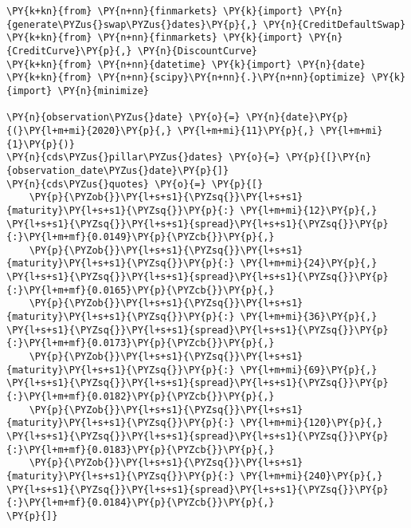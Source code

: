 \begin{Answer}
\begin{codebox}[size=fbox, boxrule=1pt, pad at break*=1mm,colback=cellbackground, colframe=cellborder]
\begin{Verbatim}[commandchars=\\\{\}]
\PY{k+kn}{from} \PY{n+nn}{finmarkets} \PY{k}{import} \PY{n}{generate\PYZus{}swap\PYZus{}dates}\PY{p}{,} \PY{n}{CreditDefaultSwap}
\PY{k+kn}{from} \PY{n+nn}{finmarkets} \PY{k}{import} \PY{n}{CreditCurve}\PY{p}{,} \PY{n}{DiscountCurve}
\PY{k+kn}{from} \PY{n+nn}{datetime} \PY{k}{import} \PY{n}{date}
\PY{k+kn}{from} \PY{n+nn}{scipy}\PY{n+nn}{.}\PY{n+nn}{optimize} \PY{k}{import} \PY{n}{minimize}

\PY{n}{observation\PYZus{}date} \PY{o}{=} \PY{n}{date}\PY{p}{(}\PY{l+m+mi}{2020}\PY{p}{,} \PY{l+m+mi}{11}\PY{p}{,} \PY{l+m+mi}{1}\PY{p}{)}
\PY{n}{cds\PYZus{}pillar\PYZus{}dates} \PY{o}{=} \PY{p}{[}\PY{n}{observation_date\PYZus{}date}\PY{p}{]}
\PY{n}{cds\PYZus{}quotes} \PY{o}{=} \PY{p}{[}
    \PY{p}{\PYZob{}}\PY{l+s+s1}{\PYZsq{}}\PY{l+s+s1}{maturity}\PY{l+s+s1}{\PYZsq{}}\PY{p}{:} \PY{l+m+mi}{12}\PY{p}{,} \PY{l+s+s1}{\PYZsq{}}\PY{l+s+s1}{spread}\PY{l+s+s1}{\PYZsq{}}\PY{p}{:}\PY{l+m+mf}{0.0149}\PY{p}{\PYZcb{}}\PY{p}{,}
    \PY{p}{\PYZob{}}\PY{l+s+s1}{\PYZsq{}}\PY{l+s+s1}{maturity}\PY{l+s+s1}{\PYZsq{}}\PY{p}{:} \PY{l+m+mi}{24}\PY{p}{,} \PY{l+s+s1}{\PYZsq{}}\PY{l+s+s1}{spread}\PY{l+s+s1}{\PYZsq{}}\PY{p}{:}\PY{l+m+mf}{0.0165}\PY{p}{\PYZcb{}}\PY{p}{,}
    \PY{p}{\PYZob{}}\PY{l+s+s1}{\PYZsq{}}\PY{l+s+s1}{maturity}\PY{l+s+s1}{\PYZsq{}}\PY{p}{:} \PY{l+m+mi}{36}\PY{p}{,} \PY{l+s+s1}{\PYZsq{}}\PY{l+s+s1}{spread}\PY{l+s+s1}{\PYZsq{}}\PY{p}{:}\PY{l+m+mf}{0.0173}\PY{p}{\PYZcb{}}\PY{p}{,}
    \PY{p}{\PYZob{}}\PY{l+s+s1}{\PYZsq{}}\PY{l+s+s1}{maturity}\PY{l+s+s1}{\PYZsq{}}\PY{p}{:} \PY{l+m+mi}{69}\PY{p}{,} \PY{l+s+s1}{\PYZsq{}}\PY{l+s+s1}{spread}\PY{l+s+s1}{\PYZsq{}}\PY{p}{:}\PY{l+m+mf}{0.0182}\PY{p}{\PYZcb{}}\PY{p}{,}
    \PY{p}{\PYZob{}}\PY{l+s+s1}{\PYZsq{}}\PY{l+s+s1}{maturity}\PY{l+s+s1}{\PYZsq{}}\PY{p}{:} \PY{l+m+mi}{120}\PY{p}{,} \PY{l+s+s1}{\PYZsq{}}\PY{l+s+s1}{spread}\PY{l+s+s1}{\PYZsq{}}\PY{p}{:}\PY{l+m+mf}{0.0183}\PY{p}{\PYZcb{}}\PY{p}{,}
    \PY{p}{\PYZob{}}\PY{l+s+s1}{\PYZsq{}}\PY{l+s+s1}{maturity}\PY{l+s+s1}{\PYZsq{}}\PY{p}{:} \PY{l+m+mi}{240}\PY{p}{,} \PY{l+s+s1}{\PYZsq{}}\PY{l+s+s1}{spread}\PY{l+s+s1}{\PYZsq{}}\PY{p}{:}\PY{l+m+mf}{0.0184}\PY{p}{\PYZcb{}}\PY{p}{,}
\PY{p}{]}


\end{Verbatim}
\end{codebox}
\end{Answer}
